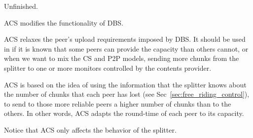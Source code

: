 
\label{sec:ACS}

\begin{note}
  Unfinished.
\end{note}

ACS modifies the functionality of DBS.

ACS relaxes the peer's upload requirements imposed by DBS. It should
be used in if it is known that some peers can provide the capacity
than others cannot, or when we want to mix the CS and P2P models,
sending more chunks from the splitter to one or more monitors
controlled by the contents provider.

ACS is based on the idea of using the information that the splitter
knows about the number of chunks that each peer has lost (see
Sec~\ref{sec:free_riding_control}), to send to those more reliable
peers a higher number of chunks than to the others. In other words,
ACS adapts the round-time of each peer to its capacity.

Notice that ACS only affects the behavior of the splitter.

\begin{comment}
In most overlay configurations (which should exhibit a full-(or
nearly-full) connected topology), all nodes should transmit exactly
the same number of chunks. This that can be considered a disadvantage
in some situations such as for example, in a ``pay-per-view''
streaming service where the QoS must be guaranteed to all users, even
if they can not send as fast as they receive.

\subsubsection{Uploading capacity estimation}
In full-connected teams, the number of chunks that a peer must
retransmit depends on the number of chunks that the peer receives from
the splitter. Moreover, the splitter can estimate the effective
uploading capacity of the peers by checking the number of times that a
peer has lost a chunk. This estimation can be used to maximizing the
QoS by assigning a different chunk-rate to each peer, depending on its
estimated capacity. In other words, if a peer does not loss chunks,
then its chunk-rate will be increased and viceversa.

\subsubsection{Adaptive chunk-rate (round-robin) scheduling}
By default, the round cycle (the frequency that the splitter sends a
chunk to a peer) of all peers is the same. ACS alters this by using,
for a peer $P_i$, a team cycle proportional to the packet-loss-ratio
of $P_i$. While $P_i$ is lossing chunks, the splitter will send to it
less chunks and will send more chunks to the rest of the team. If the
rest of the team can assume the extra transmission capacity that $P_i$
can not afford, the overlay will be stable.
\end{comment}

